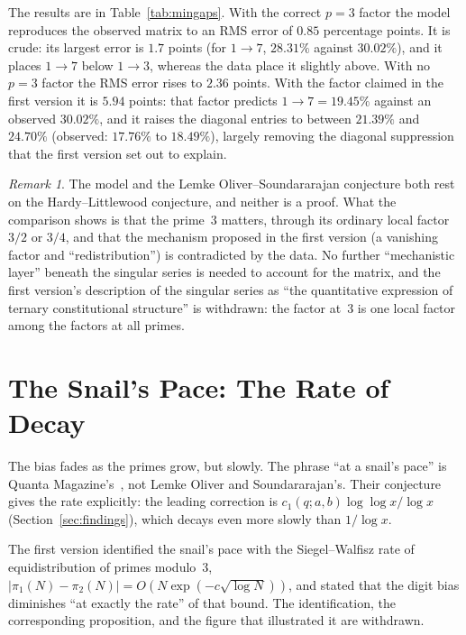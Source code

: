 \documentclass[12pt,a4paper]{article}
\theoremstyle{plain}
\theoremstyle{definition}
\theoremstyle{remark}
\newtheorem{remark}[theorem]{Remark}
\begin{document}
The results are in Table~\ref{tab:mingaps}. With the correct $p = 3$ factor the model
reproduces the observed matrix to an RMS error of $0.85$ percentage points. It is crude:
its largest error is $1.7$ points (for $1 \to 7$, $28.31\%$ against $30.02\%$), and it
places $1 \to 7$ below $1 \to 3$, whereas the data place it slightly above. With no
$p = 3$ factor the RMS error rises to $2.36$ points. With the factor claimed in the first
version it is $5.94$ points: that factor predicts $1 \to 7 = 19.45\%$ against an observed
$30.02\%$, and it raises the diagonal entries to between $21.39\%$ and $24.70\%$
(observed: $17.76\%$ to $18.49\%$), largely removing the diagonal suppression that the
first version set out to explain.

\begin{remark}
The model and the Lemke Oliver--Soundararajan conjecture both rest on the
Hardy--Littlewood conjecture, and neither is a proof. What the comparison shows is that
the prime~3 matters, through its ordinary local factor $3/2$ or $3/4$, and that the
mechanism proposed in the first version (a vanishing factor and ``redistribution'') is
contradicted by the data. No further ``mechanistic layer'' beneath the singular series is
needed to account for the matrix, and the first version's description of the singular
series as ``the quantitative expression of ternary constitutional structure'' is
withdrawn: the factor at~3 is one local factor among the factors at all primes.
\end{remark}

\section{The Snail's Pace: The Rate of Decay}
\label{sec:snail}

The bias fades as the primes grow, but slowly. The phrase ``at a snail's pace'' is
Quanta Magazine's~\cite{Kla16}, not Lemke Oliver and Soundararajan's. Their conjecture
gives the rate explicitly: the leading correction is $c_1(q;a,b)\log\log x/\log x$
(Section~\ref{sec:findings}), which decays even more slowly than $1/\log x$.

\begin{erratumbox}
\noindent The first version identified the snail's pace with the Siegel--Walfi{}sz rate
of equidistribution of primes modulo~3, $|\pi_1(N) - \pi_2(N)| = O(N
\exp(-c\sqrt{\log N}))$, and stated that the digit bias diminishes ``at exactly the rate''
of that bound. The identification, the corresponding proposition, and the figure that
illustrated it are withdrawn.
\end{erratumbox}
\end{document}
